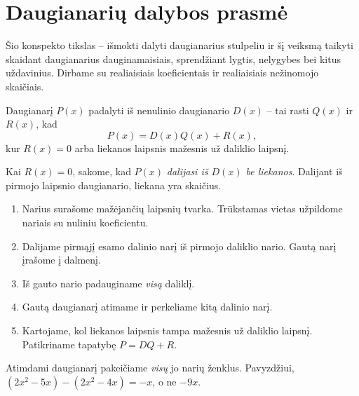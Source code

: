 \documentclass[11pt,a4paper]{scrartcl}
\begin{document}
\section{Daugianarių dalybos prasmė}
Šio konspekto tikslas -- išmokti dalyti daugianarius stulpeliu ir šį veiksmą taikyti skaidant daugianarius dauginamaisiais, sprendžiant lygtis, nelygybes bei kitus uždavinius. Dirbame su realiaisiais koeficientais ir realiaisiais nežinomojo skaičiais.
\begin{definition}
Daugianarį \(P(x)\) padalyti iš nenulinio daugianario \(D(x)\) -- tai rasti  \(Q(x)\) ir  \(R(x)\), kad
\[
P(x)=D(x)Q(x)+R(x),
\]
kur \(R(x)=0\) arba liekanos laipsnis mažesnis už daliklio laipsnį.
\end{definition}
Kai \(R(x)=0\), sakome, kad \(P(x)\) \emph{dalijasi iš \(D(x)\) be liekanos}. Dalijant iš pirmojo laipsnio daugianario, liekana yra skaičius.
\begin{algorithm}
\leavevmode\par
\begin{enumerate}[label=\arabic*.,leftmargin=*,nosep]
\item Narius surašome mažėjančių laipsnių tvarka. Trūkstamas vietas užpildome nariais su nuliniu koeficientu.
\item Dalijame pirmąjį esamo dalinio narį iš pirmojo daliklio nario. Gautą narį įrašome į dalmenį.
\item Iš gauto nario padauginame \emph{visą} daliklį.
\item Gautą daugianarį atimame ir perkeliame kitą dalinio narį.
\item Kartojame, kol liekanos laipsnis tampa mažesnis už daliklio laipsnį. Patikriname tapatybę \(P=DQ+R\).
\end{enumerate}
\end{algorithm}
\begin{remark*}
Atimdami daugianarį pakeičiame \emph{visų} jo narių ženklus. Pavyzdžiui,
\((2x^2-5x)-(2x^2-4x)=-x\), o ne \(-9x\).
\end{remark*}

\clearpage
\end{document}
